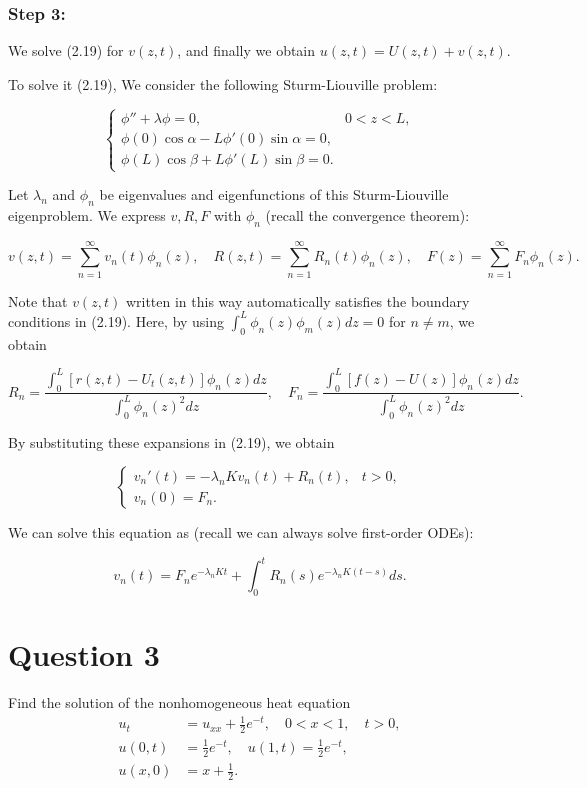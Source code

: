 \documentclass[lang=en,11pt]{template}
\begin{document}
\begin{solution}
\subsubsection*{Step 3:}
We solve (2.19) for \( v(z,t) \), and finally we obtain \( u(z,t) = U(z,t) + v(z,t) \).

To solve it (2.19), We consider the following Sturm-Liouville problem:

\[
\begin{cases}
\phi'' + \lambda \phi = 0, & 0 < z < L, \\
\phi(0) \cos \alpha - L \phi'(0) \sin \alpha = 0, \\
\phi(L) \cos \beta + L \phi'(L) \sin \beta = 0.
\end{cases}
\]

Let \( \lambda_n \) and \( \phi_n \) be eigenvalues and eigenfunctions of this Sturm-Liouville eigenproblem. We express \( v, R, F \) with \( \phi_n \) (recall the convergence theorem):

\[
v(z,t) = \sum_{n=1}^{\infty} v_n(t) \phi_n(z), \quad R(z,t) = \sum_{n=1}^{\infty} R_n(t) \phi_n(z), \quad F(z) = \sum_{n=1}^{\infty} F_n \phi_n(z).
\]

Note that \( v(z,t) \) written in this way automatically satisfies the boundary conditions in (2.19). Here, by using \( \int_0^L \phi_n(z) \phi_m(z) dz = 0 \) for \( n \neq m \), we obtain

\[
R_n = \frac{\int_0^L [r(z,t) - U_t(z,t)] \phi_n(z) dz}{\int_0^L \phi_n(z)^2 dz}, \quad F_n = \frac{\int_0^L [f(z) - U(z)] \phi_n(z) dz}{\int_0^L \phi_n(z)^2 dz}.
\]

By substituting these expansions in (2.19), we obtain

\[
\begin{cases}
v_n'(t) = -\lambda_n K v_n(t) + R_n(t), & t > 0, \\
v_n(0) = F_n.
\end{cases}
\]

We can solve this equation as (recall we can always solve first-order ODEs):

\[
v_n(t) = F_n e^{-\lambda_n K t} + \int_0^t R_n(s) e^{-\lambda_n K (t-s)} ds.
\]
    
\end{solution}



\section*{Question 3}
Find the solution of the nonhomogeneous heat equation
\[
\begin{aligned}
u_t &= u_{xx} + \frac{1}{2} e^{-t}, \quad 0 < x < 1, \quad t > 0, \\
u(0,t) &= \frac{1}{2} e^{-t}, \quad u(1,t) = \frac{1}{2} e^{-t}, \\
u(x,0) &= x + \frac{1}{2}.
\end{aligned}
\]
\end{document}
